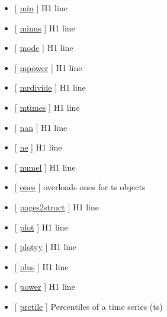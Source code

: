 \documentclass[letterpaper,10pt,english]{sphinxmanual}
\begin{document}
\begin{itemize}
\item {} 
{[} {\hyperref[classes/time_series/@ts/ts:min]{min}} {]}   H1 line

\item {} 
{[} {\hyperref[classes/time_series/@ts/ts:minus]{minus}} {]}   H1 line

\item {} 
{[} {\hyperref[classes/time_series/@ts/ts:mode]{mode}} {]}   H1 line

\item {} 
{[} {\hyperref[classes/time_series/@ts/ts:mpower]{mpower}} {]}   H1 line

\item {} 
{[} {\hyperref[classes/time_series/@ts/ts:mrdivide]{mrdivide}} {]}   H1 line

\item {} 
{[} {\hyperref[classes/time_series/@ts/ts:mtimes]{mtimes}} {]}   H1 line

\item {} 
{[} {\hyperref[classes/time_series/@ts/ts:nan]{nan}} {]}   H1 line

\item {} 
{[} {\hyperref[classes/time_series/@ts/ts:ne]{ne}} {]}   H1 line

\item {} 
{[} {\hyperref[classes/time_series/@ts/ts:numel]{numel}} {]}   H1 line

\item {} 
{[} {\hyperref[classes/time_series/@ts/ts:ones]{ones}} {]} overloads ones for ts objects

\item {} 
{[} {\hyperref[classes/time_series/@ts/ts:pages2struct]{pages2struct}} {]}   H1 line

\item {} 
{[} {\hyperref[classes/time_series/@ts/ts:plot]{plot}} {]}   H1 line

\item {} 
{[} {\hyperref[classes/time_series/@ts/ts:plotyy]{plotyy}} {]}   H1 line

\item {} 
{[} {\hyperref[classes/time_series/@ts/ts:plus]{plus}} {]}   H1 line

\item {} 
{[} {\hyperref[classes/time_series/@ts/ts:power]{power}} {]}   H1 line

\item {} 
{[} {\hyperref[classes/time_series/@ts/ts:prctile]{prctile}} {]} Percentiles of a time series (ts)


\end{itemize}
\end{document}
